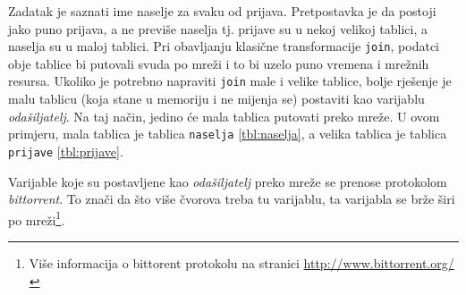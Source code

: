 \documentclass[times, utf8, zavrsni, numeric]{fer}
\begin{document}
Zadatak je saznati ime naselje za svaku od prijava. Pretpostavka je da postoji jako puno prijava, a ne previše naselja tj. prijave su u nekoj velikoj tablici, a naselja su u maloj tablici. Pri obavljanju klasične transformacije \texttt{join}, podatci obje tablice bi putovali svuda po mreži i to bi uzelo puno vremena i mrežnih resursa. Ukoliko je potrebno napraviti \texttt{join} male i velike tablice, bolje rješenje je malu tablicu (koja stane u memoriju i ne mijenja se) postaviti kao varijablu \emph{odašiljatelj}. Na taj način, jedino će mala tablica putovati preko mreže. U ovom primjeru, mala tablica je tablica \texttt{naselja} \ref{tbl:naselja}, a velika tablica je tablica \texttt{prijave} \ref{tbl:prijave}. 

Varijable koje su postavljene kao \emph{odašiljatelj} preko mreže se prenose protokolom \emph{bittorrent}. To znači da što više čvorova treba tu varijablu, ta varijabla se brže širi po mreži\footnote{Više informacija o bittorent protokolu na stranici \url{http://www.bittorrent.org/}}. 
\end{document}
